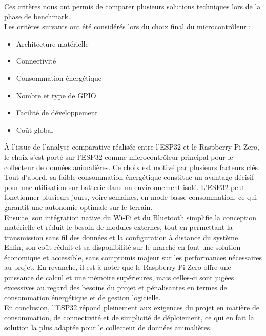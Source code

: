 Ces critères nous ont permis de comparer plusieurs solutions techniques lors de la phase de benchmark.
\\

Les critères suivants ont été considérés lors du choix final du microcontrôleur :
\begin{itemize}
    \item Architecture matérielle
    \item Connectivité
    \item Consommation énergétique
    \item Nombre et type de GPIO
    \item Facilité de développement
    \item Coût global
    \\
\end{itemize}

À l’issue de l’analyse comparative réalisée entre l’ESP32 et le Raspberry Pi Zero, le choix s’est porté sur l’ESP32 comme microcontrôleur 
principal pour le collecteur de données animalières. Ce choix est motivé par plusieurs facteurs clés. Tout d’abord, sa faible consommation
énergétique constitue un avantage décisif pour une utilisation sur batterie dans un environnement isolé. L’ESP32 peut fonctionner 
plusieurs jours, voire semaines, en mode basse consommation, ce qui garantit une autonomie optimale sur le terrain.
\\

Ensuite, son intégration native du Wi-Fi et du Bluetooth simplifie la conception matérielle et réduit le besoin de modules externes, 
tout en permettant la transmission sans fil des données et la configuration à distance du système.
\\

Enfin, son coût réduit et sa disponibilité sur le marché en font une solution économique et accessible, sans compromis majeur sur 
les performances nécessaires au projet. En revanche, il est à noter que le Raspberry Pi Zero offre une puissance de calcul et une
mémoire supérieures, mais celles-ci sont jugées excessives au regard des besoins du projet et pénalisantes en termes de consommation 
énergétique et de gestion logicielle.
\\

En conclusion, l’ESP32 répond pleinement aux exigences du projet en matière de consommation, de connectivité et de simplicité de 
déploiement, ce qui en fait la solution la plus adaptée pour le collecteur de données animalières.
\\

